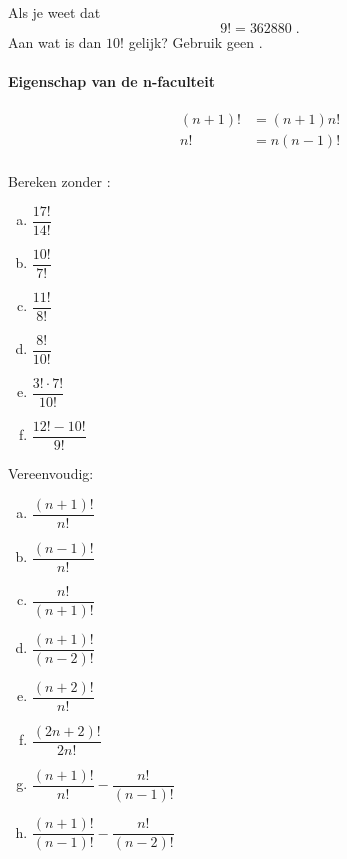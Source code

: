 \documentclass[12pt,twoside]{article}
\begin{document}
\begin{oefening}
Als je weet dat
$$9!=362880\;.$$
Aan wat is dan $10!$ gelijk? Gebruik geen .
\end{oefening}

\begin{theorie}

\paragraph*{Eigenschap van de n-faculteit}
\begin{mdframed}
\begin{align*}
  (n+1)!&=(n+1)n!\\
  n!&=n(n-1)!\\
\end{align*}
\end{mdframed}

\end{theorie}

\begin{oefening}
Bereken zonder :
\begin{multicols}{3}
\begin{enumerate}[(a)]
  \itemsep0.7em
  \item $\dfrac{17!}{14!}$
  \item $\dfrac{10!}{7!}$
  \item $\dfrac{11!}{8!}$
  \item $\dfrac{8!}{10!}$
  \item $\dfrac{3!\cdot 7!}{10!}$
  \item $\dfrac{12!-10!}{9!}$
\end{enumerate}
\end{multicols}
\end{oefening}

\begin{oefening}
Vereenvoudig:
\begin{multicols}{2}
\begin{enumerate}[(a)]
  \itemsep0.7em
  \item $\dfrac{(n+1)!}{n!}$
  \item $\dfrac{(n-1)!}{n!}$
  \item $\dfrac{n!}{(n+1)!}$
  \item $\dfrac{(n+1)!}{(n-2)!}$
  \item $\dfrac{(n+2)!}{n!}$
  \item $\dfrac{(2n+2)!}{2n!}$
  \item $\dfrac{(n+1)!}{n!}-\dfrac{n!}{(n-1)!}$
  \item $\dfrac{(n+1)!}{(n-1)!}-\dfrac{n!}{(n-2)!}$
\end{enumerate}
\end{multicols}
\end{oefening}
\end{document}
